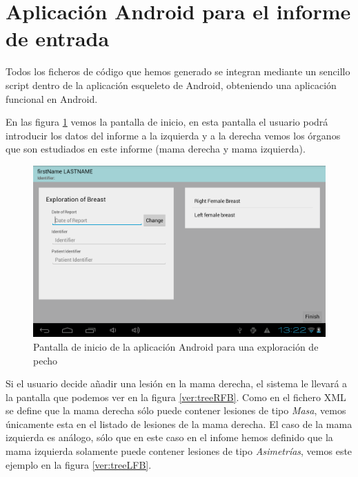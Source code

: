 \section{Aplicación Android para el informe de entrada}\label{sec:appfinal}

Todos los ficheros de código que hemos generado se integran mediante un sencillo script dentro de la aplicación esqueleto de Android, obteniendo una aplicación funcional en Android.\par

En las figura \ref{ver:summary} vemos la pantalla de inicio, en esta pantalla el usuario podrá introducir los datos del informe a la izquierda y a la derecha vemos los órganos que son estudiados en este informe (mama derecha y mama izquierda).\par


\begin{figure}[ht]
\centering
\includegraphics[scale=0.4]{./imgs/verificacion/summary.png}
\caption{Pantalla de inicio de la aplicación Android para una exploración de pecho}
\label{ver:summary}
\end{figure}

Si el usuario decide añadir una lesión en la mama derecha, el sistema le llevará a la pantalla que podemos ver en la figura \ref{ver:treeRFB}. Como en el fichero XML se define que la mama derecha sólo puede contener lesiones de tipo \emph{Masa}, vemos únicamente esta en el listado de lesiones de la mama derecha. El caso de la mama izquierda es análogo, sólo que en este caso en el infome hemos definido que la mama izquierda solamente puede contener lesiones de tipo \emph{Asimetrías}, vemos este ejemplo en la figura \ref{ver:treeLFB}.\par

